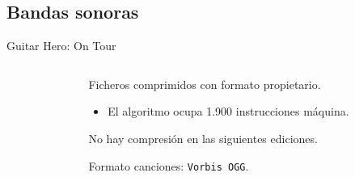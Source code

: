 \subsection{Bandas sonoras}
\begin{frame}{Guitar Hero: On Tour}

\begin{columns}
    \begin{column}{0.35\textwidth}
    \end{column}

    \begin{column}{0.65\textwidth}
    \begin{wideitemize}
        \item<1-> Ficheros comprimidos con formato propietario. \textcolor{OliveGreen}{}
        \begin{itemize}
            \item<2-> El algoritmo ocupa 1.900 instrucciones máquina. \textcolor{OliveGreen}{}
        \end{itemize}

        \item<3-> No hay compresión en las siguientes ediciones. \textcolor{BrickRed}{}

        \item<4-> Formato canciones: \texttt{Vorbis OGG}. \textcolor{BrickRed}{}
    \end{wideitemize}
    \end{column}
\end{columns}

\vfill
{}

\end{frame}

